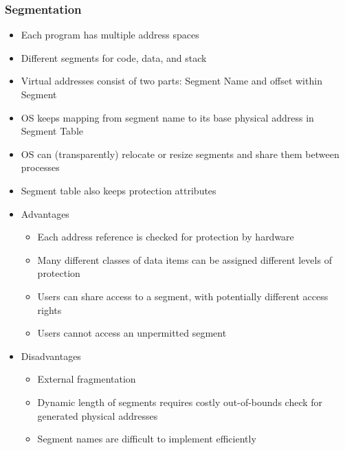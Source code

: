 \documentclass[twoside]{article}
\begin{document}
\subsubsection{Segmentation}
\begin{itemize}
\item Each program has multiple address spaces
\item Different segments for code, data, and stack
\item Virtual addresses consist of two parts: Segment Name and offset within Segment 
\item OS keeps mapping from segment name to its base physical address in Segment Table
\item OS can (transparently) relocate or resize segments
and share them between processes
\item Segment table also keeps protection attributes
\item Advantages 
\begin{itemize}
\item Each address reference is checked for protection by
hardware
\item Many different classes of data items can be assigned
different levels of protection
\item Users can share access to a segment, with potentially
different access rights
\item Users cannot access an unpermitted segment
\end{itemize}
\item Disadvantages 
\begin{itemize}
\item External fragmentation
\item Dynamic length of segments requires costly
out-of-bounds check for generated physical addresses
\item Segment names are difficult to implement efficiently
\end{itemize}
\end{itemize}
\end{document}
